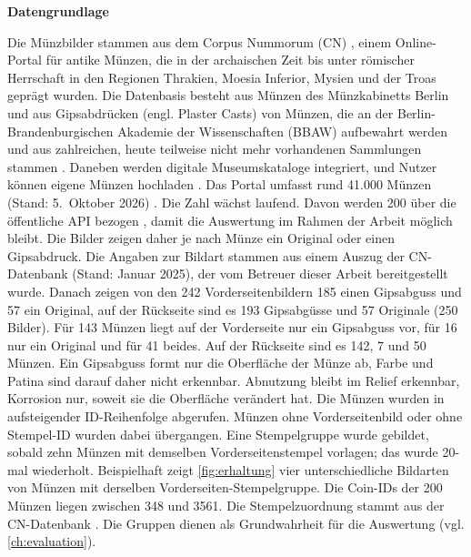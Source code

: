 \vspace{\baselineskip}

\noindent \textbf{Datengrundlage}

\noindent Die Münzbilder stammen aus dem Corpus Nummorum (CN) \cite{corpusnummorum,peter2024corpus}, einem Online-Portal für antike Münzen, die in der archaischen Zeit bis unter römischer Herrschaft in den Regionen Thrakien, Moesia Inferior, Mysien und der Troas geprägt wurden. Die Datenbasis besteht aus Münzen des Münzkabinetts Berlin und aus Gipsabdrücken (engl. Plaster Casts) von Münzen, die an der Berlin-Brandenburgischen Akademie der Wissenschaften (BBAW) aufbewahrt werden und aus zahlreichen, heute teilweise nicht mehr vorhandenen Sammlungen stammen \cite{cn-about}. Daneben werden digitale Museumskataloge integriert, und Nutzer können eigene Münzen hochladen \cite{cn-about}. Das Portal umfasst rund 41.000 Münzen (Stand: 5.\ Oktober 2026) \cite{corpusnummorum}. Die Zahl wächst laufend. Davon werden 200 über die öffentliche API bezogen \cite{cn-data-api}, damit die Auswertung im Rahmen der Arbeit möglich bleibt. Die Bilder zeigen daher je nach Münze ein Original oder einen Gipsabdruck. 
Die Angaben zur Bildart stammen aus einem Auszug der CN-Datenbank (Stand: Januar 2025), der vom Betreuer dieser Arbeit bereitgestellt wurde. Danach zeigen von den 242 Vorderseitenbildern 185 einen Gipsabguss und 57 ein Original, auf der Rückseite sind es 193 Gipsabgüsse und 57 Originale (250 Bilder). Für 143 Münzen liegt auf der Vorderseite nur ein Gipsabguss vor, für 16 nur ein Original und für 41 beides. Auf der Rückseite sind es 142, 7 und 50 Münzen.
Ein Gipsabguss formt nur die Oberfläche der Münze ab, Farbe und Patina sind darauf daher nicht erkennbar. Abnutzung bleibt im Relief erkennbar, Korrosion nur, soweit sie die Oberfläche verändert hat. Die Münzen wurden in aufsteigender ID-Reihenfolge abgerufen. Münzen ohne Vorderseitenbild oder ohne Stempel-ID wurden dabei übergangen. Eine Stempelgruppe wurde gebildet, sobald zehn Münzen mit demselben Vorderseitenstempel vorlagen; das wurde 20-mal wiederholt. Beispielhaft zeigt \cref{fig:erhaltung} vier unterschiedliche Bildarten von Münzen mit derselben Vorderseiten-Stempelgruppe. Die Coin-IDs der 200 Münzen liegen zwischen 348 und 3561. Die Stempelzuordnung stammt aus der CN-Datenbank \cite{cn-about}. Die Gruppen dienen als Grundwahrheit für die Auswertung (vgl. \cref{ch:evaluation}). 

